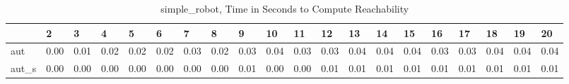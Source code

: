 \begin{table}
\centering
\caption{simple_robot, Time in Seconds to Compute Reachability}
\label{simple_robot_states_time}
\begin{tabular}{llllllllllllllllllll}
\toprule
{} &     2 &     3 &     4 &     5 &     6 &     7 &     8 &     9 &    10 &    11 &    12 &    13 &    14 &    15 &    16 &    17 &    18 &    19 &    20 \\
\midrule
aut   &  0.00 &  0.01 &  0.02 &  0.02 &  0.02 &  0.03 &  0.02 &  0.03 &  0.04 &  0.03 &  0.03 &  0.04 &  0.04 &  0.04 &  0.03 &  0.03 &  0.04 &  0.04 &  0.04 \\
aut\_s &  0.00 &  0.00 &  0.00 &  0.00 &  0.00 &  0.00 &  0.00 &  0.01 &  0.00 &  0.00 &  0.01 &  0.01 &  0.01 &  0.01 &  0.01 &  0.01 &  0.01 &  0.01 &  0.01 \\
\bottomrule
\end{tabular}
\end{table}
